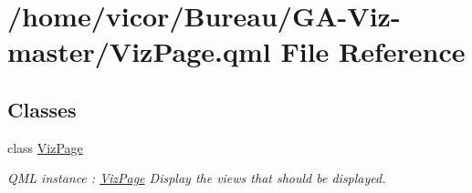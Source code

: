 \hypertarget{_viz_page_8qml}{}\section{/home/vicor/\+Bureau/\+G\+A-\/\+Viz-\/master/\+Viz\+Page.qml File Reference}
\label{_viz_page_8qml}
\subsection*{Classes}
\begin{DoxyCompactItemize}
\item 
class \hyperlink{class_viz_page}{Viz\+Page}
\begin{DoxyCompactList}\small\item\em Q\+ML instance \+: \hyperlink{class_viz_page}{Viz\+Page} Display the views that should be displayed. \end{DoxyCompactList}\end{DoxyCompactItemize}
